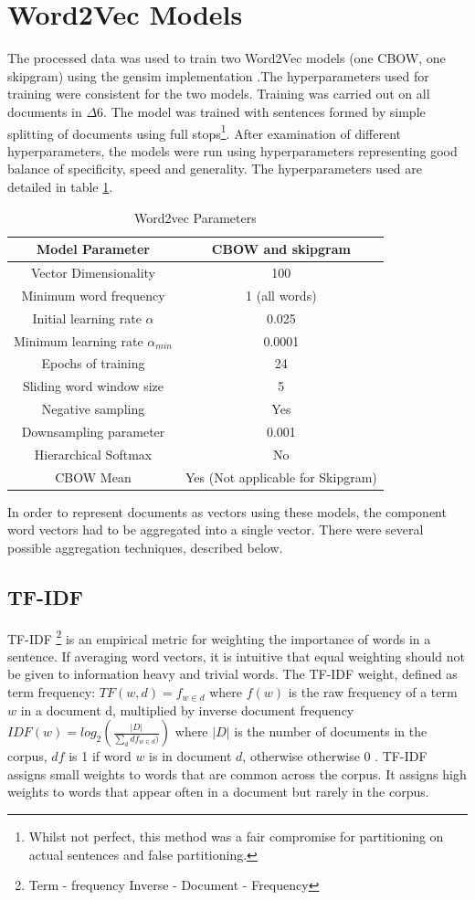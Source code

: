 \section{Word2Vec Models}
The processed data was used to train two Word2Vec models (one CBOW, one skipgram) using the gensim implementation \cite{gensim}.The hyperparameters used for training were consistent for the two models.
Training was carried out on all documents in $\Delta6$. The model was trained with sentences formed by simple splitting of documents using full stops\footnote{Whilst not perfect, this method was a fair compromise for partitioning on actual sentences and false partitioning.}. After examination of different hyperparameters, the models were run using hyperparameters representing good balance of specificity, speed and generality. The hyperparameters used are detailed in table \ref{tab:hyperparams}.
\begin{table}[H]
\begin{center}
\caption{Word2vec Parameters}
\label{tab:hyperparams}

\begin{tabular}{||c|c||}
\hline
Model Parameter &CBOW and skipgram\\
\hline
Vector Dimensionality & 100\\
Minimum word frequency & 1 (all words)\\
Initial learning rate $\alpha$ & 0.025 \\
Minimum learning rate $\alpha_{min}$&0.0001\\
Epochs of training & 24\\
Sliding word window size & 5\\
Negative sampling & Yes \\
Downsampling parameter & 0.001\\
Hierarchical Softmax & No\\
CBOW Mean & Yes (Not applicable for Skipgram) \\
\hline
\end{tabular}
\end{center}
\end{table}
In order to represent documents as vectors using these models, the component word vectors had to be aggregated into a single vector. There were several possible aggregation techniques, described below.
\subsection{TF-IDF}
TF-IDF \footnote{Term - frequency Inverse - Document - Frequency} is an empirical metric for weighting the importance of words in a sentence. If averaging word vectors, it is intuitive that equal weighting should not be given to information heavy and trivial words. The TF-IDF weight, defined as term frequency: $TF \left( w , d \right) = f_{ w \in d }$ where $f\left( w \right)$ is the raw frequency of a term $w$ in a document d,
multiplied by inverse document frequency $IDF(w) = log_{2} \left( \frac{|D|}{\sum_d df_{w \in d})} \right)$ where $|D|$ is the number of documents in the corpus, $df$ is 1 if word $w$ is in document $d$, otherwise otherwise 0 \cite{gensim}.
TF-IDF assigns small weights to words that are common across the corpus. It assigns high weights to words that appear often in a document but rarely in the corpus.
